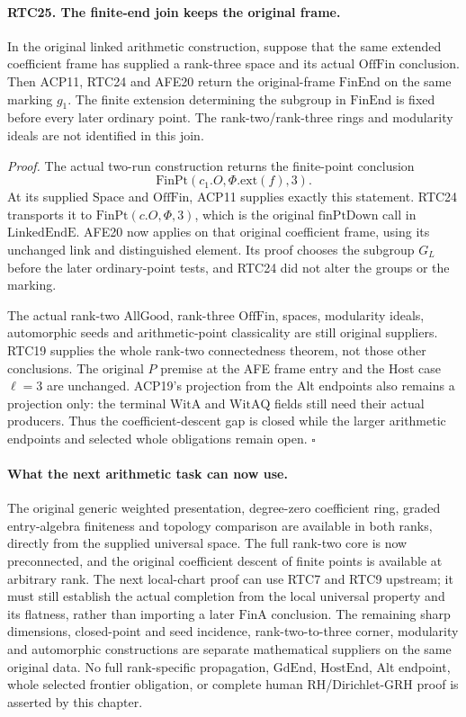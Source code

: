 \paragraph{RTC25. The finite-end join keeps the original frame.}
\label{claim:RTC25}
In the original linked arithmetic construction, suppose that the
same extended coefficient frame has supplied a rank-three space
and its actual \(\mathrm{OffFin}\) conclusion.  Then ACP11,
RTC24 and AFE20 return the original-frame \(\mathrm{FinEnd}\)
on the same marking \(g_1\).  The finite extension determining
the subgroup in \(\mathrm{FinEnd}\) is fixed before every
later ordinary point.  The rank-two/rank-three rings and modularity
ideals are not identified in this join.

\emph{Proof.}
The actual two-run construction returns the finite-point conclusion
\[
 \mathrm{FinPt}(c_1.O,\Phi.\mathrm{ext}(f),3).
\]
At its supplied \(\mathrm{Space}\) and \(\mathrm{OffFin}\),
ACP11 supplies exactly this statement.  RTC24 transports it to
\(\mathrm{FinPt}(c.O,\Phi,3)\), which is the original
\(\mathrm{finPtDown}\) call in \(\mathrm{LinkedEndE}\).
AFE20 now applies on that original coefficient frame, using its
unchanged link and distinguished element.  Its proof chooses the
subgroup \(G_L\) before the later ordinary-point tests, and
RTC24 did not alter the groups or the marking.

The actual rank-two \(\mathrm{AllGood}\), rank-three
\(\mathrm{OffFin}\), spaces, modularity ideals, automorphic
seeds and arithmetic-point classicality are still original
suppliers.  RTC19 supplies the whole rank-two connectedness
theorem, not those other conclusions.  The original \(P\)
premise at the AFE frame entry and the Host case \(\ell=3\)
are unchanged.  ACP19's projection from the Alt endpoints also
remains a projection only: the terminal \(\mathrm{WitA}\)
and \(\mathrm{WitAQ}\) fields still need their actual producers.
Thus the coefficient-descent gap is closed while the larger
arithmetic endpoints and selected whole obligations remain open.
\hfill\(\square\)

\paragraph{What the next arithmetic task can now use.}
The original generic weighted presentation, degree-zero coefficient
ring, graded entry-algebra finiteness and topology comparison are
available in both ranks, directly from the supplied universal space.
The full rank-two core is now preconnected, and the original
coefficient descent of finite points is available at arbitrary rank.
The next local-chart proof can use RTC7 and RTC9 upstream; it must
still establish the actual completion from the local universal
property and its flatness, rather than importing a later
\(\mathrm{FinA}\) conclusion.  The remaining sharp dimensions,
closed-point and seed incidence, rank-two-to-three corner, modularity
and automorphic constructions are separate mathematical suppliers on
the same original data.  No full rank-specific propagation,
\(\mathrm{GdEnd}\), \(\mathrm{HostEnd}\), Alt endpoint,
whole selected frontier obligation, or complete human RH/Dirichlet-GRH
proof is asserted by this chapter.
